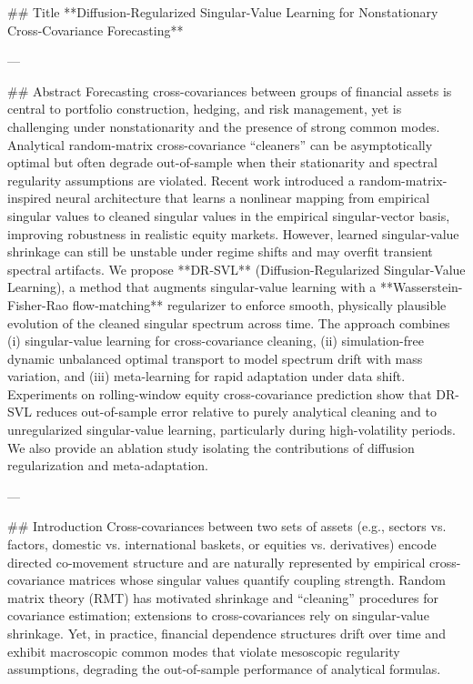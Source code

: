 ## Title  
**Diffusion-Regularized Singular-Value Learning for Nonstationary Cross-Covariance Forecasting**

---

## Abstract  
Forecasting cross-covariances between groups of financial assets is central to portfolio construction, hedging, and risk management, yet is challenging under nonstationarity and the presence of strong common modes. Analytical random-matrix cross-covariance “cleaners” can be asymptotically optimal but often degrade out-of-sample when their stationarity and spectral regularity assumptions are violated. Recent work introduced a random-matrix-inspired neural architecture that learns a nonlinear mapping from empirical singular values to cleaned singular values in the empirical singular-vector basis, improving robustness in realistic equity markets. However, learned singular-value shrinkage can still be unstable under regime shifts and may overfit transient spectral artifacts. We propose **DR-SVL** (Diffusion-Regularized Singular-Value Learning), a method that augments singular-value learning with a **Wasserstein-Fisher-Rao flow-matching** regularizer to enforce smooth, physically plausible evolution of the cleaned singular spectrum across time. The approach combines (i) singular-value learning for cross-covariance cleaning, (ii) simulation-free dynamic unbalanced optimal transport to model spectrum drift with mass variation, and (iii) meta-learning for rapid adaptation under data shift. Experiments on rolling-window equity cross-covariance prediction show that DR-SVL reduces out-of-sample error relative to purely analytical cleaning and to unregularized singular-value learning, particularly during high-volatility periods. We also provide an ablation study isolating the contributions of diffusion regularization and meta-adaptation.

---

## Introduction  
Cross-covariances between two sets of assets (e.g., sectors vs. factors, domestic vs. international baskets, or equities vs. derivatives) encode directed co-movement structure and are naturally represented by empirical cross-covariance matrices whose singular values quantify coupling strength. Random matrix theory (RMT) has motivated shrinkage and “cleaning” procedures for covariance estimation; extensions to cross-covariances rely on singular-value shrinkage. Yet, in practice, financial dependence structures drift over time and exhibit macroscopic common modes that violate mesoscopic regularity assumptions, degrading the out-of-sample performance of analytical formulas.

